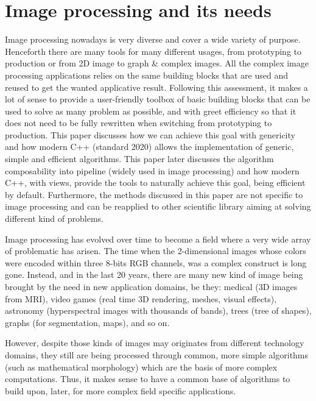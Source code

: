 \chapter{Image processing and its needs}
\label{motivations_and_context.chap.image_processing_and_its_needs}

Image processing nowadays is very diverse and cover a wide variety of purpose. Henceforth there are many tools for many
different usages, from prototyping to production or from 2D image to graph \& complex images. All the complex image
processing applications relies on the same building blocks that are used and reused to get the wanted applicative
result. Following this assessment, it makes a lot of sense to provide a user-friendly toolbox of basic building blocks
that can be used to solve as many problem as possible, and with greet efficiency so that it does not need to be fully
rewritten when switching from prototyping to production. This paper discusses how we can achieve this goal with
genericity and how modern C++ (standard 2020) allows the implementation of generic, simple and efficient algorithms.
This paper later discusses the algorithm composability into pipeline (widely used in image processing) and how modern
C++, with views, provide the tools to naturally achieve this goal, being efficient by default. Furthermore, the methods
discussed in this paper are not specific to image processing and can be reapplied to other scientific library aiming at
solving different kind of problems.

Image processing has evolved over time to become a field where a very wide array of problematic has arisen. The time
when the 2-dimensional images whose colors were encoded within three 8-bits RGB channels, was a complex construct is
long gone. Instead, and in the last 20 years, there are many new kind of image being brought by the need in new
application domains, be they: medical (3D images from MRI), video games (real time 3D rendering, meshes, visual
effects), astronomy (hyperspectral images with thousands of bands), trees (tree of shapes), graphs (for segmentation,
maps), and so on.

However, despite those kinds of images may originates from different technology domains, they still are being processed
through common, more simple algorithms (such as mathematical morphology) which are the basis of more complex
computations. Thus, it makes sense to have a common base of algorithms to build upon, later, for more complex field
specific applications.

